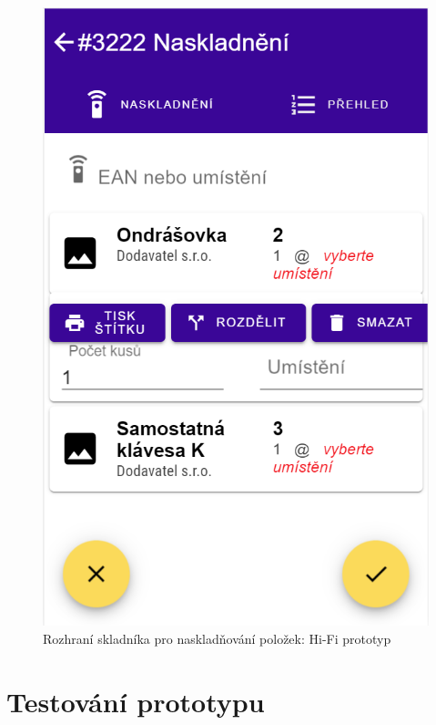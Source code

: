 \begin{figure}[]
\includegraphics[height=0.6\textheight]{../png/hifi/naskladneni.png}
\caption{Rozhraní skladníka pro naskladňování položek: Hi-Fi prototyp} \label{picture:hifi}
\end{figure}


\section{Testování prototypu}

